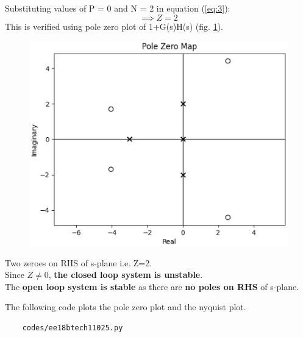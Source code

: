 Substituting values of P = 0 and N = 2 in equation (\ref{eq:3}):
\begin{equation}
 \implies Z = 2
\end{equation}
This is verified using pole zero plot of 1+G(s)H(s) (fig. \ref{fig:pz1}).
\begin{figure}[ht!]
    \includegraphics[width=\columnwidth]{./figs/ee18btech11025/pzG1.eps}
    \caption{}
    \label{fig:pz1}
\end{figure}
Two zeroes on RHS of s-plane i.e. Z=2. \\
Since $Z\neq0$, \textbf{the closed loop system is unstable}. \\
The \textbf{open loop system is stable} as there are \textbf{no poles on RHS} of s-plane.

The following code plots the pole zero plot and the nyquist plot.
\begin{lstlisting}
    codes/ee18btech11025.py
\end{lstlisting}
